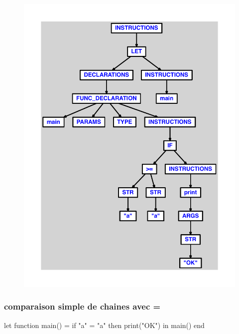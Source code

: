 \documentclass{article}
\begin{document}
\begin{figure}[H]\centering\includegraphics[max width=\textwidth]{ast/ast_178.pdf}\end{figure}\subsubsection{comparaison simple de chaines avec =}
\begin{verbatimtab}
let
	function main() =
		if "a" = "a" then print("OK")
in main() end
\end{verbatimtab}
\end{document}
